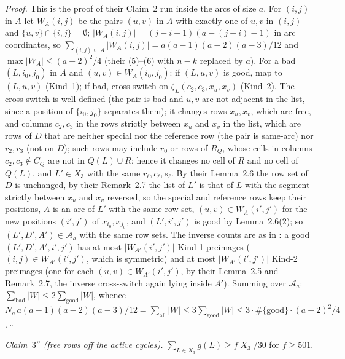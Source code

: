 \emph{Proof.}  This is the proof of their Claim~2 run inside the arcs
of size $a$.
For $(i,j)$ in $A$ let $W_A(i,j)$ be the pairs $(u,v)$ in $A$ with
exactly one of $u,v$ in $(i,j)$ and $\{u,v\}\cap\{i,j\}=\emptyset$;
$|W_A(i,j)|=(j-i-1)(a-(j-i)-1)$ in arc coordinates, so
$\sum_{(i,j)\subseteq A}|W_A(i,j)|=a(a-1)(a-2)(a-3)/12$ and
$\max|W_A|\le(a-2)^2/4$ (their (5)--(6) with $n-k$ replaced by $a$).
For a bad $(L,i_0,j_0)$ in $A$ and $(u,v)\in W_A(i_0,j_0)$: if
$(L,u,v)$ is good, map to $(L,u,v)$ (Kind~1); if bad, cross-switch on
$\zeta_L(c_2,c_3,x_u,x_v)$ (Kind~2).  The cross-switch is well defined
(the pair is bad and $u,v$ are not adjacent in the list, since a
position of $\{i_0,j_0\}$ separates them); it changes rows $x_u,x_v$,
which are free, and columns $c_2,c_3$ in the rows strictly between
$x_u$ and $x_v$ in the list, which are rows of $D$ that are neither
special nor the reference row (the pair is same-arc) nor $r_2,r_3$ (not
on $D$); such rows may include $r_0$ or rows of $R_Q$, whose cells in
columns $c_2,c_3\notin C_Q$ are not in $Q(L)\cup R$; hence it changes no
cell of $R$ and no cell of $Q(L)$, and $L'\in X_3$ with the
same $r_\ell,c_\ell,s_\ell$.  By their Lemma~2.6 the row set of $D$ is
unchanged, by their Remark~2.7 the list of $L'$ is that of $L$ with
the segment strictly between $x_u$ and $x_v$ reversed, so the special
and reference rows keep their positions, $A$ is an arc of $L'$ with
the same row set, $(u,v)\in W_A(i',j')$ for the new positions
$(i',j')$ of $x_{i_0},x_{j_0}$, and $(L',i',j')$ is good by
Lemma~2.6(2); so $(L',D',A')\in\mathcal A_a$ with the same row sets.
The inverse counts are as in \cite{AM26}: a good $(L',D',A',i',j')$ has
at most $|W_{A'}(i',j')|$ Kind-1 preimages ($(i,j)\in W_{A'}(i',j')$,
which is symmetric) and at most $|W_{A'}(i',j')|$ Kind-2 preimages (one
for each $(u,v)\in W_{A'}(i',j')$, by their Lemma~2.5 and Remark~2.7,
the inverse cross-switch again lying inside $A'$).  Summing over
$\mathcal A_a$: $\sum_{\text{bad}}|W|\le2\sum_{\text{good}}|W|$, whence
$N_a\,a(a-1)(a-2)(a-3)/12=\sum_{\text{all}}|W|\le3\sum_{\text{good}}|W|\le3\cdot\#\{\text{good}\}\cdot(a-2)^2/4$.  $\square$

\emph{Claim~$3''$ (free rows off the active cycles).}
$\sum_{L\in X_3}g(L)\ge f|X_3|/30$ for $f\ge501$.

